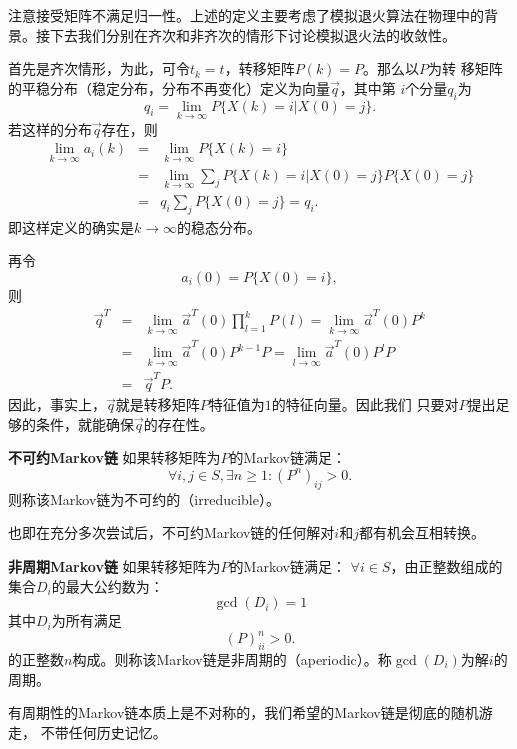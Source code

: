 注意接受矩阵不满足归一性。上述的定义主要考虑了模拟退火算法在物理中的背
景。接下去我们分别在齐次和非齐次的情形下讨论模拟退火法的收敛性。

首先是齐次情形，为此，可令$t_k = t$，转移矩阵$P(k) = P$。那么以$P$为转
移矩阵的平稳分布（稳定分布，分布不再变化）定义为向量$\vec{q}$，其中第
$i$个分量$q_i$为
\begin{equation}
  q_i = \lim_{k \to \infty}P\{X(k) = i | X(0) = j\}.
  \label{eq::station_vec}
\end{equation}
若这样的分布$\vec{q}$存在，则
\begin{eqnarray*}
  \lim_{k \to \infty} a_i(k) & = & \lim_{k \to \infty} P\{X(k) = i\} \\
  & = & \lim_{k \to \infty} \sum_j P\{X(k) = i | X(0) = j\}P\{X(0) = j\} \\
  & = & q_i \sum_{j} P\{X(0) = j\} = q_i.
\end{eqnarray*}
即这样定义的确实是$k \to \infty$的稳态分布。

再令
\begin{equation}
  a_i(0) = P\{X(0) = i\},
\end{equation}
则
\begin{eqnarray*}
  \vec{q}^T & = & \lim_{k \to \infty} \vec{a}^T(0) \prod_{l = 1}^k P(l)
  = \lim_{k \to \infty} \vec{a}^T(0) P^k \\
  & = & \lim_{k \to \infty} \vec{a}^T(0)P^{k - 1}P
  = \lim_{l \to \infty}\vec{a}^T(0)P^lP \\
  & = & \vec{q}^TP.
\end{eqnarray*}
因此，事实上，$\vec{q}$就是转移矩阵$P$特征值为$1$的特征向量。因此我们
只要对$P$提出足够的条件，就能确保$\vec{q}$的存在性。

\begin{definition}{\hei \bf 不可约Markov链} 如果转移矩阵为$P$的Markov链满足：
  \begin{equation}
    \forall i, j \in S, \exists n \geq 1 : (P^n)_{ij} > 0.
  \end{equation}
  则称该Markov链为不可约的（irreducible）。
\end{definition}
也即在充分多次尝试后，不可约Markov链的任何解对$i$和$j$都有机会互相转换。

\begin{definition}{\hei \bf 非周期Markov链} 如果转移矩阵为$P$的Markov链满足：
  $\forall i \in S$，由正整数组成的集合$D_i$的最大公约数为：
  \begin{equation}
    \gcd(D_i) = 1
  \end{equation}
  其中$D_i$为所有满足
  \begin{equation}
    (P)^n_{ii} > 0.
  \end{equation}
  的正整数$n$构成。则称该Markov链是非周期的（aperiodic）。称$\gcd(D_i)$为解$i$的周期。
\end{definition}
有周期性的Markov链本质上是不对称的，我们希望的Markov链是彻底的随机游走，
不带任何历史记忆。

